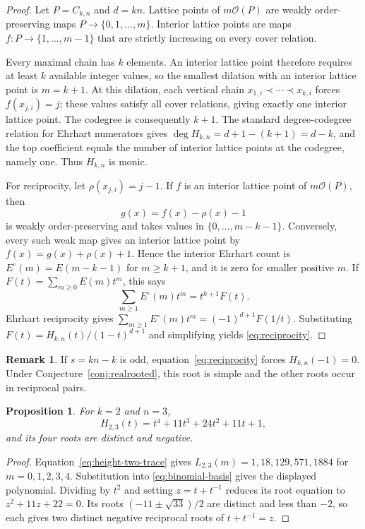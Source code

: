 \documentclass[11pt,a4paper]{article}
\newtheorem{proposition}[theorem]{Proposition}
\theoremstyle{definition}
\newtheorem{remark}[theorem]{Remark}
\begin{document}
\begin{proof}
Let $P=C_{k,n}$ and $d=kn$. Lattice points of $m\mathcal{O}(P)$ are weakly order-preserving maps $P\to\{0,1,\ldots,m\}$. Interior lattice points are maps $f:P\to\{1,\ldots,m-1\}$ that are strictly increasing on every cover relation.

Every maximal chain has $k$ elements. An interior lattice point therefore requires at least $k$ available integer values, so the smallest dilation with an interior lattice point is $m=k+1$. At this dilation, each vertical chain $x_{1,i}\prec\cdots\prec x_{k,i}$ forces $f(x_{j,i})=j$; these values satisfy all cover relations, giving exactly one interior lattice point. The codegree is consequently $k+1$. The standard degree-codegree relation for Ehrhart numerators gives $\deg H_{k,n}=d+1-(k+1)=d-k$, and the top coefficient equals the number of interior lattice points at the codegree, namely one. Thus $H_{k,n}$ is monic.

For reciprocity, let $\rho(x_{j,i})=j-1$. If $f$ is an interior lattice point of $m\mathcal{O}(P)$, then
\[
g(x)=f(x)-\rho(x)-1
\]
is weakly order-preserving and takes values in $\{0,\ldots,m-k-1\}$. Conversely, every such weak map gives an interior lattice point by $f(x)=g(x)+\rho(x)+1$. Hence the interior Ehrhart count is $E^\circ(m)=E(m-k-1)$ for $m\ge k+1$, and it is zero for smaller positive $m$. If $F(t)=\sum_{m\ge0}E(m)t^m$, this says
\[
\sum_{m\ge1}E^\circ(m)t^m=t^{k+1}F(t).
\]
Ehrhart reciprocity gives $\sum_{m\ge1}E^\circ(m)t^m=(-1)^{d+1}F(1/t)$. Substituting $F(t)=H_{k,n}(t)/(1-t)^{d+1}$ and simplifying yields \eqref{eq:reciprocity}.
\end{proof}

\begin{remark}\label{rem:minusone}
If $s=kn-k$ is odd, equation~\eqref{eq:reciprocity} forces $H_{k,n}(-1)=0$. Under Conjecture~\ref{conj:realrooted}, this root is simple and the other roots occur in reciprocal pairs.
\end{remark}

\begin{proposition}\label{prop:k23}
For $k=2$ and $n=3$,
\[
H_{2,3}(t)=t^4+11t^3+24t^2+11t+1,
\]
and its four roots are distinct and negative.
\end{proposition}

\begin{proof}
Equation~\eqref{eq:height-two-trace} gives $L_{2,3}(m)=1,18,129,571,1884$ for $m=0,1,2,3,4$. Substitution into \eqref{eq:binomial-basis} gives the displayed polynomial. Dividing by $t^2$ and setting $z=t+t^{-1}$ reduces its root equation to $z^2+11z+22=0$. Its roots $(-11\pm\sqrt{33})/2$ are distinct and less than $-2$, so each gives two distinct negative reciprocal roots of $t+t^{-1}=z$.
\end{proof}
\end{document}
